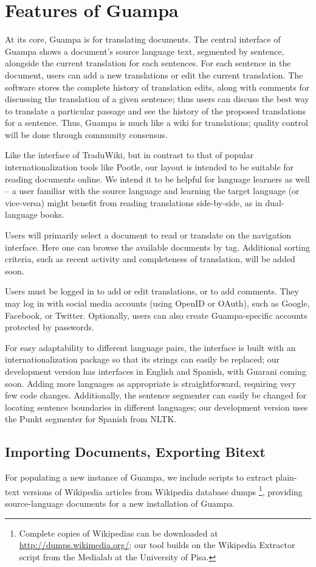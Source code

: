 \documentclass[10pt, a4paper]{article}
\begin{document}
\section{Features of Guampa}
At its core, Guampa is for translating documents. The central interface of
Guampa shows a document's source language text, segmented by sentence,
alongside the current translation for each sentences. For each sentence in the
document, users can add a new translations or edit the current translation. The
software stores the complete history of translation edits, along with comments
for discussing the translation of a given sentence; thus users can discuss the
best way to translate a particular passage and see the history of the proposed
translations for a sentence. Thus, Guampa is much like a wiki for translations;
quality control will be done through community consensus.


Like the interface of TraduWiki, but in contrast to that of popular
internationalization tools like Pootle, our layout is intended to be suitable
for reading documents online. We intend it to be helpful for language learners
as well -- a user familiar with the source language and learning the target
language (or vice-versa) might benefit from reading translations side-by-side,
as in dual-language books.

Users will primarily select a document to read or translate on the navigation
interface. Here one can browse the available documents by tag. Additional
sorting criteria, such as recent activity and completeness of translation, will
be added soon.

Users must be logged in to add or edit translations, or to add comments. They
may log in with social media accounts (using OpenID or OAuth), such as Google,
Facebook, or Twitter. Optionally, users can also create Guampa-specific
accounts protected by passwords.

For easy adaptability to different language pairs, the interface is built with
an internationalization package so that its strings can easily be replaced; our
development version has interfaces in English and Spanish, with Guarani coming
soon. Adding more languages as appropriate is straightforward, requiring very
few code changes. Additionally, the sentence segmenter can easily be changed
for locating sentence boundaries in different languages; our development
version uses the Punkt segmenter for Spanish from NLTK.


\subsection{Importing Documents, Exporting Bitext}
For populating a new instance of Guampa, we include scripts to extract
plain-text versions of Wikipedia articles from Wikipedia database dumps
\footnote{Complete copies of Wikipedias can be downloaded at
\url{http://dumps.wikimedia.org/}; our tool builds on the Wikipedia Extractor
script from the Medialab at the University of Pisa. }, providing
source-language documents for a new installation of Guampa.
\end{document}
